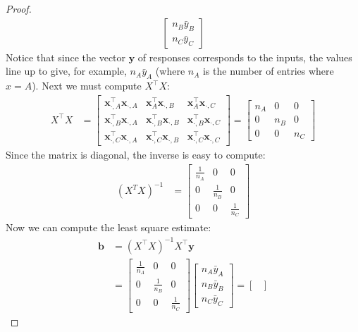 \documentclass[12pt]{article}
\begin{document}
\begin{enumerate}
\begin{proof}
\begin{align*}
\begin{bmatrix}
			n_B\bar{y}_B\\
			n_C\bar{y}_C
		\end{bmatrix}
	\end{align*}
	Notice that since the vector $\mathbf{y}$ of responses corresponds to the inputs,
	the values line up to give, for example, $n_A\bar{y}_A$ (where $n_A$ is the
	number of entries where $x=A$). Next we must compute $X^\top X$:
	\begin{align*}
		X^\top X &=\begin{bmatrix}
			\mathbf{x}_{\cdot, A}^\top \mathbf{x}_{\cdot, A} & \mathbf{x}_A^\top \mathbf{x}_{\cdot, B} & \mathbf{x}_A^\top \mathbf{x}_{\cdot, C}\\
			\mathbf{x}_{\cdot, B}^\top \mathbf{x}_{\cdot, A} & \mathbf{x}_{\cdot, B}^\top \mathbf{x}_{\cdot, B} & \mathbf{x}_{\cdot, B}^\top \mathbf{x}_{\cdot, C}\\
			\mathbf{x}_{\cdot, C}^\top \mathbf{x}_{\cdot, A} & \mathbf{x}_{\cdot, C}^\top \mathbf{x}_{\cdot, B} & \mathbf{x}_{\cdot, C}^\top \mathbf{x}_{\cdot, C}
		\end{bmatrix}
		=\begin{bmatrix}
			n_A & 0 & 0\\
			0 & n_B & 0\\
			0 & 0 & n_C
		\end{bmatrix}
	\end{align*}
	Since the matrix is diagonal, the inverse is easy to compute:
	\begin{align*}
		(X^{T}X)^{-1}&=\begin{bmatrix}
			\frac{1}{n_A} & 0 & 0\\
			0 & \frac{1}{n_B} & 0\\
			0 & 0 & \frac{1}{n_C}
		\end{bmatrix}
	\end{align*}
	Now we can compute the least square estimate:
	\begin{align*}
		\mathbf{b}
		&=(X^\top X)^{-1}X^\top \mathbf{y}\\
		&=\begin{bmatrix}
			\frac{1}{n_A} & 0 & 0\\
			0 & \frac{1}{n_B} & 0\\
			0 & 0 & \frac{1}{n_C}
		\end{bmatrix}
		\begin{bmatrix}
			n_A\bar{y}_A\\
			n_B\bar{y}_B\\
			n_C\bar{y}_C
		\end{bmatrix}
		=\begin{bmatrix}

\end{bmatrix}
\end{align*}
\end{proof}
\end{enumerate}
\end{document}
